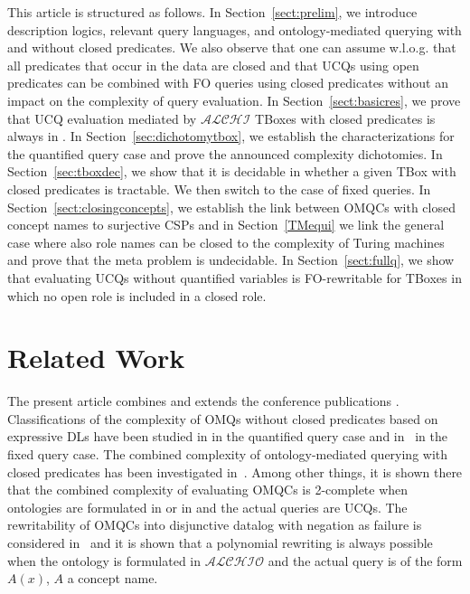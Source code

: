 \documentclass{lmcs}
\theoremstyle{definition}
\begin{document}
\smallskip

This article is structured as follows. In Section~\ref{sect:prelim}, we
introduce description logics, relevant query languages, and
ontology-mediated querying with and without closed predicates.
We also observe that one can assume w.l.o.g. that all
predicates that occur in the data are closed and that UCQs using
open predicates can be combined with FO queries using closed predicates
without an impact on the complexity of query evaluation. In
Section~\ref{sect:basicres}, we prove that UCQ evaluation mediated by
$\mathcal{ALCHI}$ TBoxes with closed predicates is always in \conp.
%
In Section~\ref{sec:dichotomytbox}, we establish the characterizations
for the quantified query case and prove the announced complexity
dichotomies. In Section~\ref{sec:tboxdec}, we show that it is decidable in \ptime
whether a given TBox with closed predicates is tractable. 
We then switch to the case of fixed queries. In
Section~\ref{sect:closingconcepts}, we establish the link between
OMQCs with closed concept names to surjective CSPs and in
Section~\ref{TMequi} we link the general case where also role names
can be closed to the complexity of \np Turing machines and prove that
the meta problem is undecidable. In Section~\ref{sect:fullq}, we show
that evaluating UCQs without quantified variables is FO-rewritable for
\dlliter TBoxes in which no open role is included in a closed
role.

\section{Related Work}

The present article combines and extends the conference publications
\cite{DBLP:conf/ijcai/LutzSW15b,Lutz:2013:ODA:2540128.2540276}.
Classifications of the complexity of OMQs without closed predicates
based on expressive DLs have been studied in
\cite{DBLP:journals/lmcs/LutzW17,DBLP:conf/pods/HernichLPW17} in the
quantified query case and in~\cite{DBLP:journals/tods/BienvenuCLW14}
in the fixed query case. The combined complexity of ontology-mediated
querying with closed predicates has been investigated
in~\cite{DBLP:conf/kr/NgoOS16}. Among other things, it is shown there
that the combined complexity of evaluating OMQCs is 2\ExpTime-complete
when ontologies are formulated in \dlliter or in \EL and the actual
queries are UCQs. The rewritability of OMQCs into disjunctive datalog
with negation as failure is considered
in~\cite{DBLP:conf/ijcai/AhmetajOS16} and it is shown that a
polynomial rewriting is always possible when the ontology is
formulated in $\mathcal{ALCHIO}$ and the actual query is of the form
$A(x)$, $A$ a concept name.
 
\end{document}
